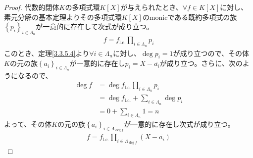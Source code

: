 \documentclass[dvipdfmx]{jsarticle}
\begin{document}
\begin{proof}
代数的閉体$K$の多項式環$K[ X]$が与えられたとき、$\forall f \in K[ X]$に対し、素元分解の基本定理よりその多項式環$K[ X]$のmonicである既約多項式の族$\left\{ p_{i} \right\}_{i \in \varLambda_{n}}$が一意的に存在して次式が成り立つ。
\begin{align*}
f = {f}_{\mathrm{l.c.}}\prod_{i \in \varLambda_{n}} p_{i}
\end{align*}
このとき、定理\ref{3.3.5.4}より$\forall i \in \varLambda_{n}$に対し、$\deg p_{i} = 1$が成り立つので、その体$K$の元の族$\left\{ a_{i} \right\}_{i \in \varLambda_{n}}$が一意的に存在し$p_{i} = X - \overline{a_{i}}$が成り立つ。さらに、次のようになるので、
\begin{align*}
\deg f &= \deg{{f}_{\mathrm{l.c.}}\prod_{i \in \varLambda_{n}} p_{i}} \\
&= \deg{f}_{\mathrm{l.c.}} + \sum_{i \in \varLambda_{n}} {\deg p_{i}} \\
&= 0 + \sum_{i \in \varLambda_{n}} 1 = n
\end{align*}
よって、その体$K$の元の族$\left\{ a_{i} \right\}_{i \in \varLambda_{\deg f}}$が一意的に存在し次式が成り立つ。
\begin{align*}
f = {f}_{\mathrm{l.c.}}\prod_{i \in \varLambda_{\deg f}} \left( X - \overline{a_{i}} \right)
\end{align*}
\end{proof}
\end{document}
